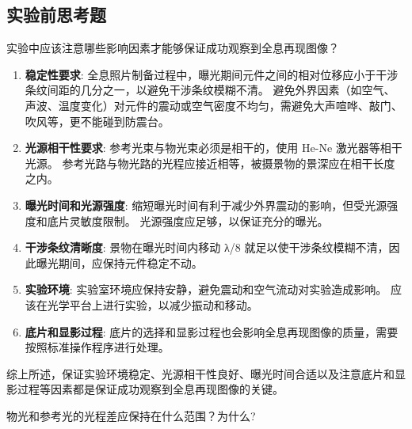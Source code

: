 \documentclass[dvipsnames, svgnames,a4paper,11pt]{article}
\begin{document}
\subsection{实验前思考题}
	\begin{question}
		实验中应该注意哪些影响因素才能够保证成功观察到全息再现图像？
	\end{question}
		
		\begin{enumerate}[label=\roman*.]
			\item \textbf{稳定性要求}:
			全息照片制备过程中，曝光期间元件之间的相对位移应小于干涉条纹间距的几分之一，以避免干涉条纹模糊不清。
			避免外界因素（如空气、声波、温度变化）对元件的震动或空气密度不均匀，需避免大声喧哗、敲门、吹风等，更不能碰到防震台。
			
			\item \textbf{光源相干性要求}:	
			参考光束与物光束必须是相干的，使用 He-Ne 激光器等相干光源。
			参考光路与物光路的光程应接近相等，被摄景物的景深应在相干长度之内。

			\item \textbf{曝光时间和光源强度}:
			缩短曝光时间有利于减少外界震动的影响，但受光源强度和底片灵敏度限制。
			光源强度应足够，以保证充分的曝光。

			\item \textbf{干涉条纹清晰度}:
			景物在曝光时间内移动 λ/8 就足以使干涉条纹模糊不清，因此曝光期间，应保持元件稳定不动。
			
			\item \textbf{实验环境}:
			实验室环境应保持安静，避免震动和空气流动对实验造成影响。
			应该在光学平台上进行实验，以减少振动和移动。

			\item \textbf{底片和显影过程}:
			底片的选择和显影过程也会影响全息再现图像的质量，需要按照标准操作程序进行处理。
			
		\end{enumerate}
	
		综上所述，保证实验环境稳定、光源相干性良好、曝光时间合适以及注意底片和显影过程等因素都是保证成功观察到全息再现图像的关键。
		
		
		
		

	\begin{question}
		物光和参考光的光程差应保持在什么范围？为什么?
	\end{question}
		
\end{document}
